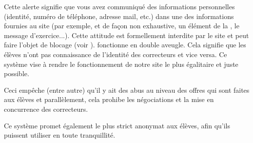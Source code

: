 ﻿Cette alerte signifie que vous avez communiqué des informations personnelles (identité, numéro de téléphone, adresse mail, etc.) dans une des informations fournies au site (par exemple, et de façon non exhaustive, un élément de la , le message d'exercice...). Cette attitude est formellement interdite par le site et peut faire l'objet de blocage (voir ).
\eDevoir fonctionne en double aveugle. Cela signifie que les élèves n'ont pas connaissance de l'identité des correcteurs et vice versa. Ce système vise à rendre le fonctionnement de notre site le plus égalitaire et juste possible.
\item Ceci empêche (entre autre) qu'il y ait des abus au niveau des offres qui sont faites aux élèves et parallèlement, cela prohibe les négociations et la mise en concurrence des correcteurs.
\item Ce système promet également le plus strict anonymat aux élèves, afin qu'ils puissent utiliser \eDevoir en toute tranquillité.